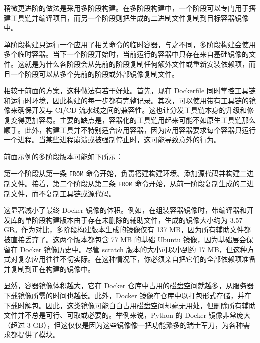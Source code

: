 稍微更进阶的做法是采用多阶段构建。在多阶段构建中，一个阶段可以专门用于搭建工具链并编译项目，而另一个阶段则把生成的二进制文件复制到目标容器镜像中。

单阶段构建只运行一个应用了相关命令的临时容器，与之不同，多阶段构建会使用多个临时容器。当下一个阶段开始时，当前运行的容器中只存在来自基础镜像的文件。这就是为什么各阶段会从先前的阶段复制任何额外文件或重新安装依赖项，而且一个阶段可以从多个先前的阶段或外部镜像复制文件。

相较于前面的方案，这种做法有若干好处。首先，现在 Dockerfile 同时掌控工具链和运行时环境，因此构建的每一步都有完整记录。其次，可以使用带有工具链的镜像来确保开发与 CI/CD 流水线之间的兼容性。这也让分发工具链本身的升级和修复变得更加容易。主要的缺点是，容器化的工具链用起来可能不如原生工具链那么顺手。此外，构建工具并不特别适合应用容器，因为应用容器要求每个容器只运行一个进程。当某些进程崩溃或被强制停止时，这可能导致意外的行为。

前面示例的多阶段版本可能如下所示：


第一个阶段从第一条 \texttt{FROM} 命令开始，负责搭建构建环境、添加源代码并构建二进制文件。接着，第二个阶段从第二条 \texttt{FROM} 命令开始，从前一阶段复制生成的二进制文件，而不复制工具链或源代码。

\label{idx:1760}
这显著减小了最终 Docker 镜像的体积。例如，在组装容器镜像时，带编译器和开发库的单阶段构建版本由于存在未删除的辅助文件，生成的镜像大小约为 3.57 GB。作为对比，多阶段构建版本生成的镜像仅有 137 MB，因为所有辅助文件都被直接丢弃了。这两个版本都包含 77 MB 的基础 Ubuntu 镜像，因为基础层会保留在 Docker 镜像历史中。尽管 scratch 版本的大小可以小到约 17 MB，但这种方式对复杂应用往往不切实际。在这种情况下，你必须亲自把它们的全部依赖项准备并复制到正在构建的镜像中。

显然，容器镜像体积越大，它在 Docker 仓库中占用的磁盘空间就越多，从服务器下载镜像所需的时间也越长。此外，Docker 镜像在仓库中以打包形式存储，并在下载时解包。因此，这类镜像可能白白占用磁盘空间却毫无用处，但删除所有辅助文件并不总是可行、可取或必要的。举例来说，Python 的 Docker 镜像非常庞大（超过 3 GB），但这仅仅是因为这些镜像像一把功能繁多的瑞士军刀，为各种需求都提供了模块。

